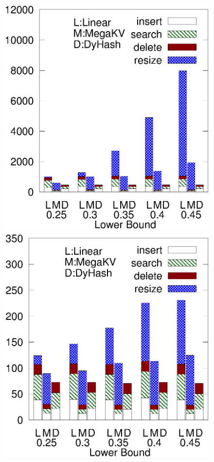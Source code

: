 \begin{figure}[ht]
\begin{minipage}{0.19\linewidth}
		\centerline{\dsreddit}
	\end{minipage}
	\begin{minipage}{0.19\linewidth}\centering
		\includegraphics[width=\linewidth]{pic/dynamic/tpch/diff_lower.eps}
		\centerline{\dstpch}
	\end{minipage}
	\begin{minipage}{0.19\linewidth}\centering
		\includegraphics[width=\linewidth]{pic/dynamic/ali/diff_lower.eps}

\end{minipage}
\end{figure}
